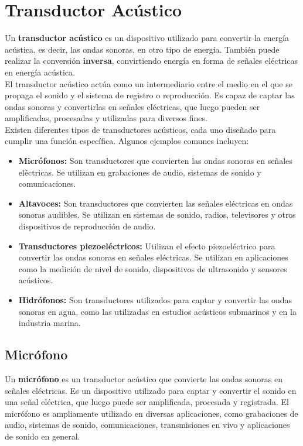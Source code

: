\documentclass[
	12pt, %
	fleqn, %
	a4paper, %
	oneside, %
]{LegrandOrangeBook}
\begin{document}
\section{Transductor Acústico}
Un \textbf{transductor acústico} es un dispositivo utilizado para convertir la energía acústica, es decir, las ondas sonoras, en otro tipo de energía. También puede realizar la conversión \textbf{inversa}, convirtiendo energía en forma de señales eléctricas en energía acústica.\\
El transductor acústico actúa como un intermediario entre el medio en el que se propaga el sonido y el sistema de registro o reproducción. Es capaz de captar las ondas sonoras y convertirlas en señales eléctricas, que luego pueden ser amplificadas, procesadas y utilizadas para diversos fines.\\
Existen diferentes tipos de transductores acústicos, cada uno diseñado para cumplir una función específica. Algunos ejemplos comunes incluyen:
\begin{itemize}
  \item \textbf{Micrófonos:} Son transductores que convierten las ondas sonoras en señales eléctricas. Se utilizan en grabaciones de audio, sistemas de sonido y comunicaciones.
  \item \textbf{Altavoces:} Son transductores que convierten las señales eléctricas en ondas sonoras audibles. Se utilizan en sistemas de sonido, radios, televisores y otros dispositivos de reproducción de audio.
  \item \textbf{Transductores piezoeléctricos:} Utilizan el efecto piezoeléctrico para convertir las ondas sonoras en señales eléctricas. Se utilizan en aplicaciones como la medición de nivel de sonido, dispositivos de ultrasonido y sensores acústicos.
  \item \textbf{Hidrófonos:} Son transductores utilizados para captar y convertir las ondas sonoras en agua, como las utilizadas en estudios acústicos submarinos y en la industria marina.
\end{itemize}
\subsection{Micrófono}
Un \textbf{micrófono} es un transductor acústico que convierte las ondas sonoras en señales eléctricas. Es un dispositivo utilizado para captar y convertir el sonido en una señal eléctrica, que luego puede ser amplificada, procesada y registrada. El micrófono es ampliamente utilizado en diversas aplicaciones, como grabaciones de audio, sistemas de sonido, comunicaciones, transmisiones en vivo y aplicaciones de sonido en general.
\end{document}
